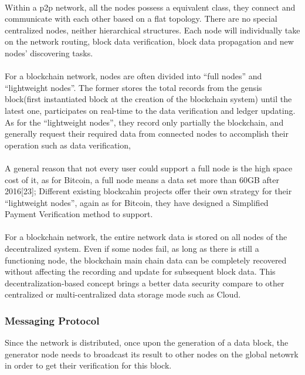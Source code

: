 \documentclass[doublespacing]{bmcart}
\begin{document}
\begin{CJK*}{UTF8}{gbsn}
\paragraph{} Within a p2p network, all the nodes possess a equivalent class, they connect and communicate with each other based on a flat topology. There are no special centralized nodes, neither hierarchical structures. Each node will individually take on the network routing, block data verification, block data propagation and new nodes' discovering tasks.
\paragraph{} For a blockchain network, nodes are often divided into ``full nodes'' and ``lightweight nodes''. The former stores the total records from the gensis block(first instantiated block at the creation of the blockchain system) until the latest one, participates on real-time to the data verification and ledger updating. As for the ``lightweight nodes'', they record only partially the blockchain, and generally request their required data from connected nodes to accomplish their operation such as data verification, \paragraph{} A general reason that not every user could support a full node is the high space cost of it, as for Bitcoin, a full node means a data set more than 60GB after 2016[23];
Different existing blockcahin projects offer their own strategy for their ``lightweight nodes'', again as for Bitcoin, they have designed a Simplified Payment Verification method to support.
\paragraph{} For a blockchain network, the entire network data is stored on all nodes of the decentralized system. Even if some nodes fail, as long as there is still a functioning node, the blockchain main chain data can be completely recovered without affecting the recording and update for subsequent block data. This decentralization-based concept brings a better data security compare to other centralized or multi-centralized data storage mode such as Cloud.
\subsubsection*{Messaging Protocol}
Since the network is distributed, once upon the generation of a data block, the generator node needs to broadcast its result to other nodes on the global netowrk in order to get their verification for this block.

\end{CJK*}
\end{document}
